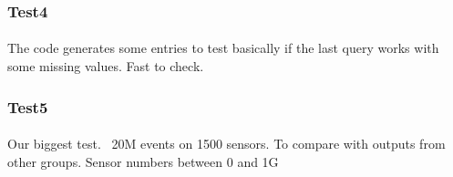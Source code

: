 \subsubsection{Test4}
\paragraph{}
The code generates some entries to test basically if the last query works with some missing values. Fast to check.

\subsubsection{Test5}
\paragraph{}
Our biggest test. ~20M events on 1500 sensors. To compare with outputs from other groups. Sensor numbers between 0 and 1G
